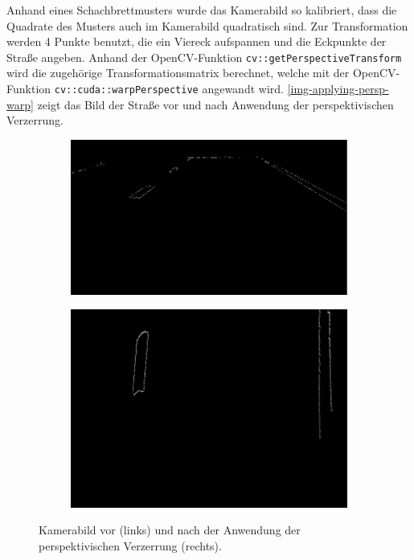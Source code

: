 \documentclass[a4paper,12pt]{report}
\begin{document}
	Anhand eines Schachbrettmusters wurde das Kamerabild so kalibriert, dass die Quadrate des Musters auch im Kamerabild quadratisch sind.
	Zur Transformation werden 4 Punkte benutzt, die ein Viereck aufspannen und die Eckpunkte der Straße angeben. Anhand der OpenCV-Funktion \texttt{cv::get\-PerspectiveTransform} wird die zugehörige Transformationsmatrix berechnet, welche mit der OpenCV-Funktion \texttt{cv::cuda::warpPerspective} angewandt wird. \autoref{img-applying-persp-warp} zeigt das Bild der Straße vor und nach Anwendung der perspektivischen Verzerrung.

	\begin{figure}[h]
		\centering
		\begin{subfigure}[c]{0.45\textwidth}
			\includegraphics[width=\textwidth]{assets/Strasse-Canny.png}
		\end{subfigure}
		\begin{subfigure}[c]{0.45\textwidth}
			\includegraphics[width=.8\textwidth]{assets/Strasse-Persp.png}
		\end{subfigure}
		\caption{Kamerabild vor (links) und nach der Anwendung der perspektivischen Verzerrung (rechts).}
		\label{img-applying-persp-warp}
	\end{figure}
\end{document}
